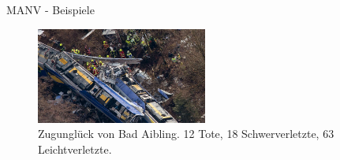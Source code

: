 \begin{frame}{MANV - Beispiele}
	\begin{examples}
		\begin{figure}
			\begin{center}
				\includegraphics[width=0.5\textwidth]{images/bad-aibling.jpg}
			\end{center}
			\caption{Zugunglück von Bad Aibling. 12 Tote, 18 Schwerverletzte, 63 Leichtverletzte.\cite{manv-badaibling}}\label{fig:badaibling}
		\end{figure}
	\end{examples}
\end{frame}
